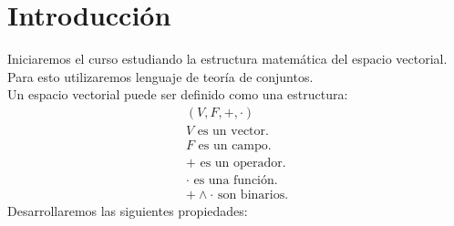 



%
%
%
%
%
\section*{Introducci\'{o}n}
Iniciaremos el curso estudiando la estructura matem\'{a}tica del  espacio vectorial. Para esto utilizaremos lenguaje de teor\'{i}a de conjuntos.\\Un espacio vectorial puede ser definido como una estructura:
\begin{align*}
(V, F, +, \cdot)\\
V \text{ es un vector. }\\
F \text{ es un campo.}\\
+ \text{ es un operador.}\\
\cdot \text{ es una funci\'{o}n.}\\
+ \land \cdot \text{ son binarios.}
\end{align*}
Desarrollaremos las siguientes propiedades:


